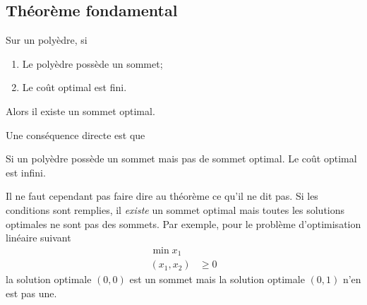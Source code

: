 \subsection{Théorème fondamental}
\begin{mytheo}
  Sur un polyèdre, si
  \begin{enumerate}
    \item Le polyèdre possède un sommet;
    \item Le coût optimal est fini.
  \end{enumerate}
  Alors il existe un sommet optimal.
\end{mytheo}
Une conséquence directe est que
\begin{mycorr}
  Si un polyèdre possède un sommet mais pas de sommet optimal.
  Le coût optimal est infini.
\end{mycorr}
Il ne faut cependant pas faire dire au théorème ce qu'il ne dit pas.
Si les conditions sont remplies, il \emph{existe} un sommet optimal mais
toutes les solutions optimales ne sont pas des sommets.
Par exemple, pour le problème d'optimisation linéaire suivant
\begin{align*}
  \min x_1\\
  (x_1,x_2) & \geq 0
\end{align*}
la solution optimale $(0,0)$ est un sommet mais la solution optimale $(0,1)$
n'en est pas une.

